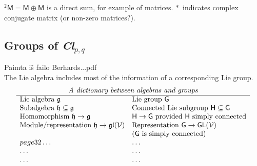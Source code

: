 $^2\mathsf{M}=\mathsf{M}\oplus\mathsf{M}$ is a direct sum, for
example of matrices.
$*$~indicates complex conjugate matrix (or non-zero matrices?).\\



\subsection{Groups of \textit{Cl}$_{p,q}$}

\vspace{5mm} Paimta i{\v s} failo Berhards...pdf
\cite{Berhards11}\\
The Lie algebra includes most of the information of a
corresponding Lie group.
\[\begin{array}{ll}
\multicolumn{2}{c}{\textit{A dictionary between algebras and
groups}}\\ \hline
\textrm{Lie algebra\ }\mathfrak{g}  & \textrm{Lie group\ }\mathsf{G}\\
\textrm{Subalgebra\ }\mathfrak{h}\subseteq \mathfrak{g} &\textrm{Connected Lie subgroup\ }\mathsf{H}\subseteq\mathsf{G} \\
\textrm{Homomorphism\ }\mathfrak{h}\rightarrow\mathfrak{g} &\mathsf{H}\rightarrow\mathsf{G}\textrm{\ provided $\mathsf{H}$ simply connected} \\
\textrm{Module/representation\ }\mathfrak{h}\rightarrow\mathfrak{gl}(\mathcal{V}) &\textrm{Representation\ }\mathsf{G}\rightarrow\mathsf{GL}(\mathcal{V}) \\
 &  (\mathsf{G}\textrm{\ is simply connected})\\
page 32\dots &\dots \\
\dots &\dots \\
\dots &\dots \\
\end{array}\]

